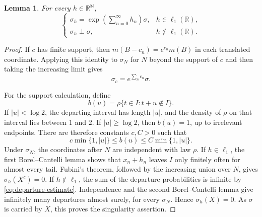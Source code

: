 \documentclass[11pt]{article}
\newtheorem{lemma}[theorem]{Lemma}
\theoremstyle{definition}
\newcommand{\N}{\mathbb N}
\newcommand{\R}{\mathbb R}
\begin{document}
\begin{lemma}
\label{lem:restricted-translation}
For every $h\in\R^{\N}$,
\[
 \begin{cases}
 \displaystyle\sigma_h=\exp\!\left(\sum_{n=0}^{\infty}h_n\right)\sigma,
       & h\in\ell_1(\R),\\[4pt]
 \sigma_h\perp\sigma,&h\notin\ell_1(\R).
 \end{cases}
\]
\end{lemma}

\begin{proof}
If $c$ has finite support, then $m(B-c_n)=e^{c_n}m(B)$ in each translated
coordinate. Applying this identity to $\sigma_N$ for $N$ beyond the support
of $c$ and then taking the increasing limit gives
\begin{equation}
 \sigma_c=e^{\sum_n c_n}\sigma.
 \label{eq:finite-shift-modulus}
\end{equation}

For the support calculation, define
\[
 b(u)=\rho\{t\in I:t+u\notin I\}.
\]
If $|u|<\log2$, the departing interval has length $|u|$, and the density
of $\rho$ on that interval lies between $1$ and $2$. If $|u|\geq\log2$,
then $b(u)=1$, up to irrelevant endpoints. There are therefore constants
$c,C>0$ such that
\begin{equation}
 c\min\{1,|u|\}\leq b(u)\leq C\min\{1,|u|\}.
 \label{eq:departure-estimate}
\end{equation}
Under $\sigma_N$, the coordinates after $N$ are independent with law
$\rho$. If $h\in\ell_1$, the first Borel--Cantelli lemma shows that
$x_n+h_n$ leaves $I$ only finitely often for almost every tail. Fubini's
theorem, followed by the increasing union over $N$, gives
$\sigma_h(X^c)=0$. If $h\notin\ell_1$, the sum of the departure
probabilities is infinite by \eqref{eq:departure-estimate}. Independence
and the second Borel--Cantelli lemma give infinitely many departures
almost surely, for every $\sigma_N$. Hence $\sigma_h(X)=0$. As $\sigma$
is carried by $X$, this proves the singularity assertion.


\end{proof}
\end{document}
